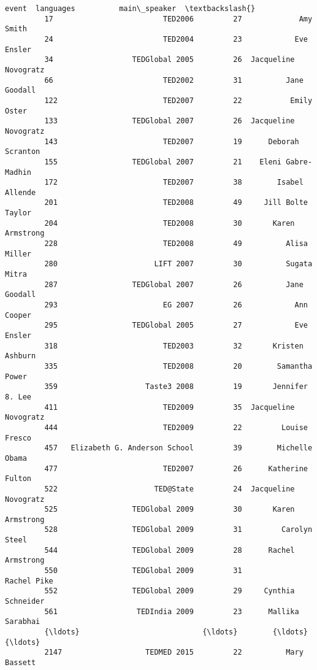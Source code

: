 \documentclass[11pt]{article}
\begin{document}
\begin{Verbatim}[commandchars=\\\{\}]
                                      event  languages          main\_speaker  \textbackslash{}
         17                         TED2006         27             Amy Smith   
         24                         TED2004         23            Eve Ensler   
         34                  TEDGlobal 2005         26  Jacqueline Novogratz   
         66                         TED2002         31          Jane Goodall   
         122                        TED2007         22           Emily Oster   
         133                 TEDGlobal 2007         26  Jacqueline Novogratz   
         143                        TED2007         19      Deborah Scranton   
         155                 TEDGlobal 2007         21    Eleni Gabre-Madhin   
         172                        TED2007         38        Isabel Allende   
         201                        TED2008         49     Jill Bolte Taylor   
         204                        TED2008         30       Karen Armstrong   
         228                        TED2008         49          Alisa Miller   
         280                      LIFT 2007         30          Sugata Mitra   
         287                 TEDGlobal 2007         26          Jane Goodall   
         293                        EG 2007         26            Ann Cooper   
         295                 TEDGlobal 2005         27            Eve Ensler   
         318                        TED2003         32       Kristen Ashburn   
         335                        TED2008         20        Samantha Power   
         359                    Taste3 2008         19       Jennifer 8. Lee   
         411                        TED2009         35  Jacqueline Novogratz   
         444                        TED2009         22         Louise Fresco   
         457   Elizabeth G. Anderson School         39        Michelle Obama   
         477                        TED2007         26      Katherine Fulton   
         522                      TED@State         24  Jacqueline Novogratz   
         525                 TEDGlobal 2009         30       Karen Armstrong   
         528                 TEDGlobal 2009         31         Carolyn Steel   
         544                 TEDGlobal 2009         28      Rachel Armstrong   
         550                 TEDGlobal 2009         31           Rachel Pike   
         552                 TEDGlobal 2009         29     Cynthia Schneider   
         561                  TEDIndia 2009         23      Mallika Sarabhai   
         {\ldots}                            {\ldots}        {\ldots}                   {\ldots}   
         2147                   TEDMED 2015         22          Mary Bassett   

\end{Verbatim}
\end{document}
